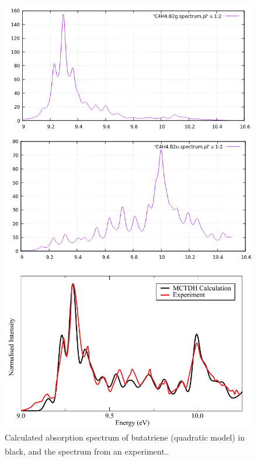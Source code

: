 \documentclass[12pt]{article}
\begin{document}
\begin{figure}[h]
    \centering
    \begin{minipage}[]{.37\textwidth}
        \centering
        \includegraphics[width=\textwidth]{img/but_spectra.png}
        \caption{Partial spectra of excitation to each of the two excited states shown in \textit{gnuplot}. They must be added to obtain the combined spectrum in Fig. \ref{fig:but_spectra}.}
        \label{fig:but_spectra_gnuplot}
    \end{minipage}\hfill\begin{minipage}[]{.57\textwidth}
        \centering
        \includegraphics[page=1,width=\textwidth]{img/but_spectra.pdf}
        \caption{Calculated absorption spectrum of butatriene (quadratic model) in black,\textsuperscript{\cite{butatrienesim}} and the spectrum from an experiment.\textsuperscript{\cite{butatrieneexp}}.}
        \label{fig:but_spectra}
    \end{minipage}
\end{figure}
\end{document}
